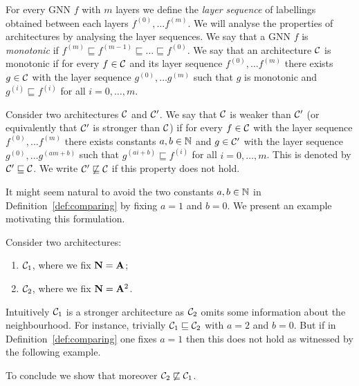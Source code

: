 For every GNN $f$ with $m$ layers we define the \emph{layer sequence} of labellings obtained between each layers $f^{(0)}, \ldots f^{(m)}$. We will analyse the properties of architectures by analysing the layer sequences. We say that a GNN $f$ is \emph{monotonic} if $f^{(m)} \sqsubseteq f^{(m-1)} \sqsubseteq \ldots \sqsubseteq f^{(0)}$. We say that an architecture $\mathcal{C}$ is monotonic if for every $f\in \mathcal{C}$ and its layer sequence $f^{(0)}, \ldots f^{(m)}$ there exists $g \in \mathcal{C}$ with the layer sequence $g^{(0)}, \ldots g^{(m)}$ such that $g$ is monotonic and $g^{(i)} \sqsubseteq f^{(i)}$ for all $i = 0,\ldots, m$.

\begin{definition}\label{def:comparing}
Consider two architectures $\mathcal{C}$ and $\mathcal{C}'$. We say that $\mathcal{C}$ is weaker than $\mathcal{C}'$ (or equivalently that $\mathcal{C}'$ is stronger than $\mathcal{C}$) if for every $f \in \mathcal{C}$ with the layer sequence $f^{(0)}, \ldots f^{(m)}$ there exists constants $a,b \in \mathbb{N}$ and $g \in \mathcal{C}'$ with the layer sequence $g^{(0)}, \ldots g^{(am + b)}$ such that $g^{(ai + b)} \sqsubseteq f^{(i)}$ for all $i = 0,\ldots,m$. This is denoted by $\mathcal{C}' \sqsubseteq \mathcal{C}$. We write $\mathcal{C}' \not \sqsubseteq \mathcal{C}$ if this property does not hold.
\end{definition}

It might seem natural to avoid the two constants $a,b \in \mathbb{N}$ in Definition~\ref{def:comparing} by fixing $a = 1$ and $b = 0$. We present an example motivating this formulation.

\begin{example}
Consider two architectures:
\begin{enumerate}
 \item $\mathcal{C}_1$, where we fix $\mathbf{N} = \mathbf{A}$;
 \item $\mathcal{C}_2$, where we fix $\mathbf{N} = \mathbf{A}^2$.
\end{enumerate}
Intuitively $\mathcal{C}_1$ is a stronger architecture as $\mathcal{C}_2$ omits some information about the neighbourhood.
For instance, trivially $\mathcal{C}_1 \sqsubseteq \mathcal{C}_2$ with $a = 2$ and $b = 0$. But if in Definition~\ref{def:comparing} one fixes $a = 1$ then this does not hold as witnessed by the following example. 

To conclude we show that moreover $\mathcal{C}_2 \not \sqsubseteq \mathcal{C}_1$.
\end{example}


